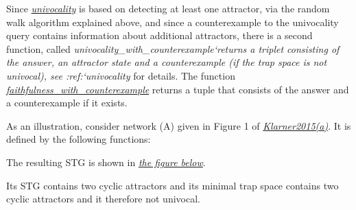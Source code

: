 \documentclass[letterpaper,10pt,english]{sphinxmanual}
\begin{document}
Since {\hyperref[AttractorDetection:univocality]{\emph{univocality}}} is based on detecting at least one attractor, via the random walk algorithm explained above,
and since a counterexample to the univocality query contains information about additional attractors,
there is a second function, called \emph{univocality\_with\_counterexample{}`returns a triplet consisting of the answer, an attractor state and a counterexample (if the trap space is not univocal),
see :ref:{}`univocality} for details.
The function {\hyperref[AttractorDetection:faithfulness-with-counterexample]{\emph{faithfulness\_with\_counterexample}}} returns a tuple that consists of the answer and a counterexample if it exists.

As an illustration, consider network (A) given in Figure 1 of {\hyperref[Bibliography:klarner2015trap]{\emph{Klarner2015(a)}}}.
It is defined by the following functions:

The resulting STG is shown in {\hyperref[Manual:figure28]{\emph{the figure below}}}.

Its STG contains two cyclic attractors and its minimal trap space \code{-{-}-} contains two cyclic attractors and it therefore not univocal.
\end{document}
